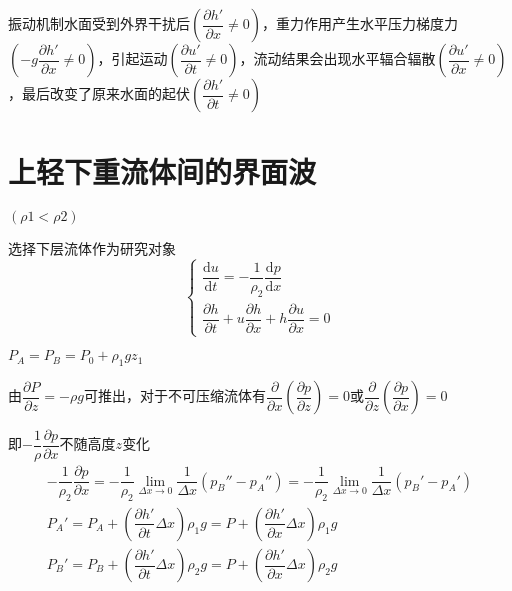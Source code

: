 \documentclass[a4paper,oneside]{ctexbook}
\begin{document}
振动机制水面受到外界干扰后\((\dfrac{\partial{h}'}{\partial{x}}\neq0)\)，重力作用产生水平压力梯度力\((-g\dfrac{\partial{h}'}{\partial{x}}\neq0)\)，引起运动\((\dfrac{\partial{u}'}{\partial{t}}\neq0)\)，流动结果会出现水平辐合辐散\((\dfrac{\partial{u}'}{\partial{x}}\neq0)\)，最后改变了原来水面的起伏\((\dfrac{\partial{h}'}{\partial{t}}\neq0)\)

\section{上轻下重流体间的界面波}

\((\rho1<\rho2)\)
\begin{figure}[htbp]
    \centering%
\end{figure}

选择下层流体作为研究对象
\begin{equation}
    \begin{cases}
    \dfrac{\mathrm{d}u}{\mathrm{d}t}=-\dfrac{1}{\rho_2}\dfrac{\mathrm{d}p}{\mathrm{d}x}\\
    \dfrac{\partial{h}}{\partial{t}}+u\dfrac{\partial{h}}{\partial{x}}+h\dfrac{\partial{u}}{\partial{x}}=0
    \end{cases}
    \label{eqa9}
\end{equation}

\(P_A=P_B=P_0+\rho_1gz_1\)

由\(\dfrac{\partial{P}}{\partial{z}}=-\rho{g}\)可推出，对于不可压缩流体有\(\dfrac{\partial}{\partial{x}}\left(\dfrac{\partial{p}}{\partial{z}}\right)=0\)或\(\dfrac{\partial}{\partial{z}}\left(\dfrac{\partial{p}}{\partial{x}}\right)=0\)

即\(-\dfrac{1}{\rho}\dfrac{\partial{p}}{\partial{x}}\)不随高度\(z\)变化
\begin{align}
    -\dfrac{1}{\rho_2}\dfrac{\partial{p}}{\partial{x}}=-\dfrac{1}{\rho_2}\lim_{\Delta{x}\to0}\dfrac{1}{\Delta{x}}(p_B''-p_A'')=-\dfrac{1}{\rho_2}\lim_{\Delta{x}\to0}\dfrac{1}{\Delta{x}}(p_B'-p_A')\label{eqa10}\\
    P_A'=P_A+\left(\dfrac{\partial{h'}}{\partial{t}}\Delta{x}\right)\rho_1g=P+\left(\dfrac{\partial{h'}}{\partial{x}}\Delta{x}\right)\rho_1g\label{eqa11}\\
    P_B'=P_B+\left(\dfrac{\partial{h'}}{\partial{t}}\Delta{x}\right)\rho_2g=P+\left(\dfrac{\partial{h'}}{\partial{x}}\Delta{x}\right)\rho_2g\label{eqa12}
\end{align}
\end{document}

